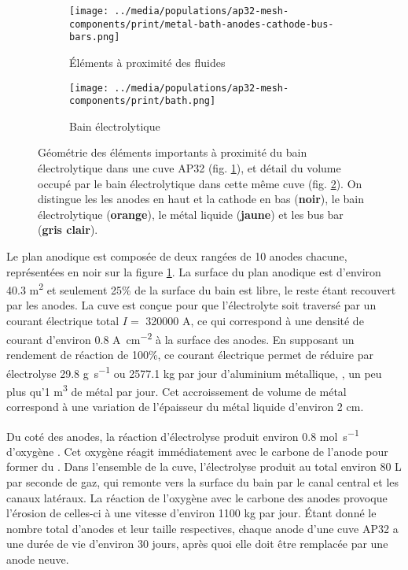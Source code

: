\begin{figure}[t]
  \begin{center}
    \begin{subfigure}[b]{0.49\textwidth}
      \texttt{[image: ../media/populations/ap32-mesh-components/print/metal-bath-anodes-cathode-bus-bars.png]}
      \caption{Éléments à proximité des fluides}
      \label{fig:ap32-geometry-elements}
    \end{subfigure}
%
    \begin{subfigure}[b]{0.49\textwidth}
      \texttt{[image: ../media/populations/ap32-mesh-components/print/bath.png]}
      \caption{Bain électrolytique}
      \label{fig:ap32-geometry-electrolyte}
    \end{subfigure}
%
    \caption{Géométrie des éléments importants à proximité
      du bain électrolytique dans une cuve AP32
      (fig. \ref{fig:ap32-geometry-elements}), et détail du volume
      occupé par le bain électrolytique dans cette même cuve
      (fig. \ref{fig:ap32-geometry-electrolyte}). On distingue les
      les anodes en haut et la cathode
      en bas (\textbf{noir}), le bain électrolytique
      (\textbf{orange}), le métal liquide (\textbf{jaune}) et les
      bus bar (\textbf{gris clair}).}
    \label{fig:ap32-geometry}
  \end{center}
\end{figure}

Le plan anodique est composée de deux rangées de 10 anodes chacune,
représentées en noir sur la figure \ref{fig:ap32-geometry-elements}. La
surface du plan anodique est d'environ \num{40.3} \si{\square\meter}
et seulement \num{25}\% de la surface du bain est libre, le reste
étant recouvert par les anodes. La cuve est conçue pour que
l'électrolyte soit traversé par un courant électrique total $I = $
\num{320000} \si{\ampere}, ce qui correspond à une densité de courant
d'environ \num{0.8} \si{\ampere\per\square\centi\meter} à la surface
des anodes. En supposant un rendement de réaction de \num{100}\%, ce
courant électrique permet de réduire par électrolyse \num{29.8}
\si{\gram\per\second} ou \num{2577.1} \si{\kilo\gram} par jour
d'aluminium métallique, \ie, un peu plus qu'\num{1} \si{\cubic\meter}
de métal par jour. Cet accroissement de volume de métal correspond à
une variation de l'épaisseur du métal liquide d'environ \num{2}
\si{\centi\meter}.

Du coté des anodes, la réaction d'électrolyse produit environ
\num{0.8} \si{\mol\per\second} d'oxygène . Cet oxygène réagit
immédiatement avec le carbone de l'anode pour former du . Dans
l'ensemble de la cuve, l'électrolyse produit au total environ \num{80}
\si{\liter} par seconde de gaz, qui remonte vers la surface du bain
par le canal central et les canaux latéraux. La réaction de l'oxygène
avec le carbone des anodes provoque l'érosion de celles-ci à une
vitesse d'environ \num{1100} \si{\kilo\gram} par jour. Étant donné le
nombre total d'anodes et leur taille respectives, chaque anode d'une
cuve AP32 a une durée de vie d'environ 30 jours, après quoi elle doit
être remplacée par une anode neuve.

